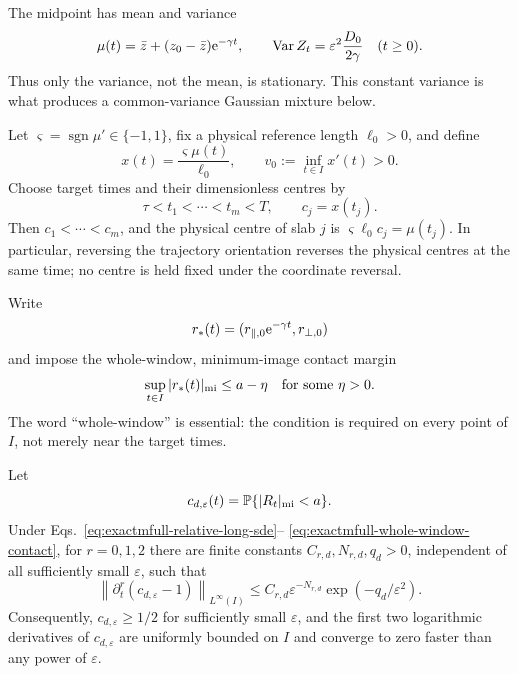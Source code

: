 The midpoint has mean and variance
\begin{equation}
 \mu(t)=\bar z+(z_0-\bar z)\mathrm e^{-\gamma t},
 \qquad
 \operatorname{Var}Z_t=\varepsilon^2\frac{D_0}{2\gamma}
 \quad(t\ge0).
 \label{eq:exactmfull-stationary-variance}
\end{equation}
Thus only the variance, not the mean, is stationary.  This constant variance
is what produces a common-variance Gaussian mixture below.

Let \(\varsigma=\operatorname{sgn}\mu'\in\{-1,1\}\), fix a physical
reference length \(\ell_0>0\), and define
\begin{equation}
 x(t)=\frac{\varsigma\mu(t)}{\ell_0},
 \qquad v_0:=\inf_{t\in I}x'(t)>0.
 \label{eq:exactmfull-increasing-coordinate}
\end{equation}
Choose target times and their dimensionless centres by
\begin{equation}
 \tau<t_1<\cdots<t_m<T,
 \qquad c_j=x(t_j).
 \label{eq:exactmfull-targets}
\end{equation}
Then \(c_1<\cdots<c_m\), and the physical centre of slab \(j\) is
\(\varsigma\ell_0c_j=\mu(t_j)\).  In particular, reversing the trajectory
orientation reverses the physical centres at the same time; no centre is
held fixed under the coordinate reversal.

Write
\begin{equation}
 r_*(t)=(r_{\parallel,0}\mathrm e^{-\gamma t},r_{\perp,0})
 \label{eq:exactmfull-relative-deterministic-path}
\end{equation}
and impose the whole-window, minimum-image contact margin
\begin{equation}
 \sup_{t\in I}|r_*(t)|_{\rm mi}\le a-\eta
 \quad\text{for some }\eta>0.
 \label{eq:exactmfull-whole-window-contact}
\end{equation}
The word ``whole-window'' is essential: the condition is required on every
point of \(I\), not merely near the target times.

\begin{lemma}
\label{lem:exactmfull-contact-tail}
Let
\begin{equation}
 c_{d,\varepsilon}(t)
 =\mathbb P\{|R_t|_{\rm mi}<a\}.
 \label{eq:exactmfull-contact-probability}
\end{equation}
Under Eqs.~\eqref{eq:exactmfull-relative-long-sde}--
\eqref{eq:exactmfull-whole-window-contact}, for \(r=0,1,2\) there are finite
constants \(C_{r,d},N_{r,d},q_d>0\), independent of all sufficiently small
\(\varepsilon\), such that
\begin{equation}
 \left\|\partial_t^r(c_{d,\varepsilon}-1)\right\|_{L^\infty(I)}
 \le C_{r,d}\varepsilon^{-N_{r,d}}
       \exp(-q_d/\varepsilon^2).
 \label{eq:exactmfull-contact-tail-bound}
\end{equation}
Consequently, \(c_{d,\varepsilon}\ge1/2\) for sufficiently small
\(\varepsilon\), and the first two logarithmic derivatives of
\(c_{d,\varepsilon}\) are uniformly bounded on \(I\) and converge to zero
faster than any power of \(\varepsilon\).
\end{lemma}

